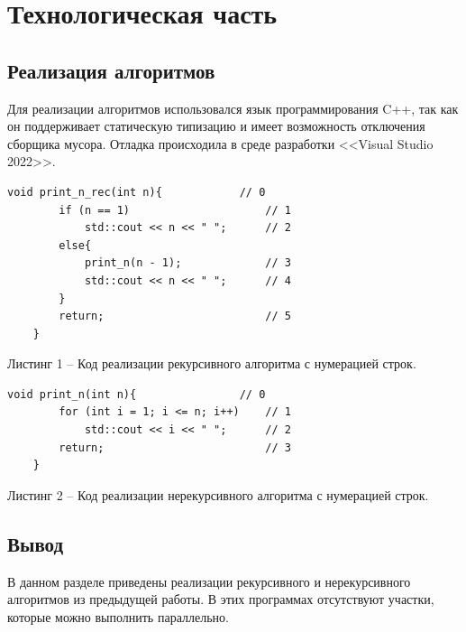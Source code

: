 \chapter{Технологическая часть}

\section{Реализация алгоритмов}
Для реализации алгоритмов использовался язык программирования C++, так как он поддерживает статическую типизацию и имеет возможность отключения сборщика мусора. Отладка происходила в среде разработки <<Visual Studio 2022>>.


\begin{lstlisting}[style=cpp]
	void print_n_rec(int n){            // 0
		if (n == 1)                     // 1
			std::cout << n << " ";		// 2
		else{
			print_n(n - 1); 			// 3
			std::cout << n << " ";		// 4
		}
		return;                         // 5
	}
\end{lstlisting}
Листинг 1 -- Код реализации рекурсивного алгоритма с нумерацией строк.\\

\begin{lstlisting}[style=cpp]
	void print_n(int n){                // 0
		for (int i = 1; i <= n; i++)    // 1
			std::cout << i << " ";      // 2
		return;                         // 3
	}
\end{lstlisting}
Листинг 2 -- Код реализации нерекурсивного алгоритма с нумерацией строк.

\section*{Вывод}

В данном разделе приведены реализации рекурсивного и нерекурсивного алгоритмов из предыдущей работы. В этих программах отсутствуют участки, которые можно выполнить параллельно.

\clearpage
